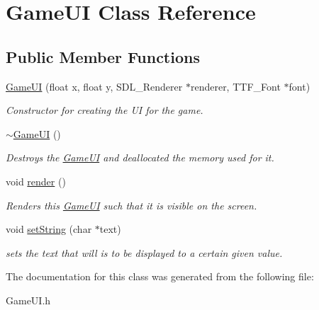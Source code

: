 \hypertarget{classGameUI}{}\section{Game\+UI Class Reference}
\label{classGameUI}
\subsection*{Public Member Functions}
\begin{DoxyCompactItemize}
\item 
\mbox{\label{classGameUI_a97fc917f8a87fa128686fa1b2ed36c03}} 
\hyperlink{classGameUI_a97fc917f8a87fa128686fa1b2ed36c03}{Game\+UI} (float x, float y, S\+D\+L\+\_\+\+Renderer $\ast$renderer, T\+T\+F\+\_\+\+Font $\ast$font)
\begin{DoxyCompactList}\small\item\em Constructor for creating the UI for the game. \end{DoxyCompactList}\item 
\mbox{\label{classGameUI_a66787f961c635ef1a502f8e884996077}} 
\hyperlink{classGameUI_a66787f961c635ef1a502f8e884996077}{$\sim$\+Game\+UI} ()
\begin{DoxyCompactList}\small\item\em Destroys the \hyperlink{classGameUI}{Game\+UI} and deallocated the memory used for it. \end{DoxyCompactList}\item 
\mbox{\label{classGameUI_a80db655dd9f0b995da15040b24b16781}} 
void \hyperlink{classGameUI_a80db655dd9f0b995da15040b24b16781}{render} ()
\begin{DoxyCompactList}\small\item\em Renders this \hyperlink{classGameUI}{Game\+UI} such that it is visible on the screen. \end{DoxyCompactList}\item 
\mbox{\label{classGameUI_affb0638c94f955f5fbb66598901fd3eb}} 
void \hyperlink{classGameUI_affb0638c94f955f5fbb66598901fd3eb}{set\+String} (char $\ast$text)
\begin{DoxyCompactList}\small\item\em sets the text that will is to be displayed to a certain given value. \end{DoxyCompactList}\end{DoxyCompactItemize}


The documentation for this class was generated from the following file\+:\begin{DoxyCompactItemize}
\item 
Game\+U\+I.\+h\end{DoxyCompactItemize}
